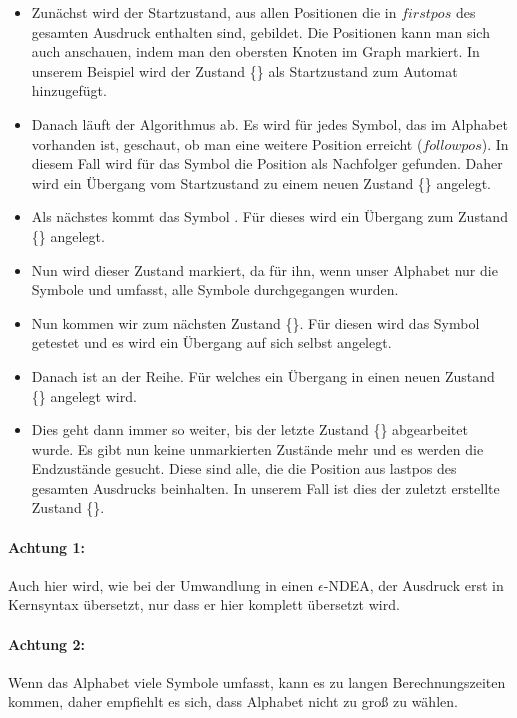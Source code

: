 \begin{itemize}
  \item Zunächst wird der Startzustand, aus allen Positionen die in $firstpos$ des gesamten Ausdruck enthalten sind, gebildet. Die Positionen kann man sich auch anschauen, indem man den obersten Knoten im Graph markiert. In unserem Beispiel wird der Zustand \{\} als Startzustand zum Automat hinzugefügt.
  \item Danach läuft der Algorithmus ab. Es wird für jedes Symbol, das im Alphabet vorhanden ist, geschaut, ob man eine weitere Position erreicht ($followpos$). In diesem Fall wird für das Symbol  die Position  als Nachfolger gefunden. Daher wird ein Übergang  vom Startzustand zu einem neuen Zustand \{\} angelegt.
  \item Als nächstes kommt das Symbol . Für dieses wird ein Übergang zum Zustand \{\} angelegt.
  \item Nun wird dieser Zustand markiert, da für ihn, wenn unser Alphabet nur die Symbole  und  umfasst, alle Symbole durchgegangen wurden.
  \item Nun kommen wir zum nächsten Zustand \{\}. Für diesen wird das Symbol  getestet und es wird ein Übergang auf sich selbst angelegt.
  \item Danach ist  an der Reihe. Für welches ein Übergang in einen neuen Zustand \{\} angelegt wird.
  \item Dies geht dann immer so weiter, bis der letzte Zustand \{\} abgearbeitet wurde. Es gibt nun keine unmarkierten Zustände mehr und es werden die Endzustände gesucht. Diese sind alle, die die Position aus lastpos des gesamten Ausdrucks beinhalten. In unserem Fall ist dies der zuletzt erstellte Zustand \{\}.
\end{itemize}

\paragraph*{Achtung 1:} Auch hier wird, wie bei der Umwandlung in einen $\epsilon$-NDEA, der Ausdruck erst in Kernsyntax übersetzt, nur dass er hier komplett übersetzt wird.

\paragraph*{Achtung 2:} Wenn das Alphabet viele Symbole umfasst, kann es zu langen Berechnungszeiten kommen, daher empfiehlt es sich, dass Alphabet nicht zu groß zu wählen.

